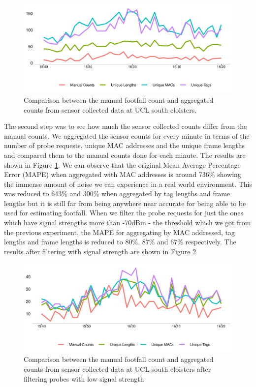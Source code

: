 \begin{figure}
  \includegraphics{images/ucl-comparison-before.png}
  \caption{Comparison between the manual footfall count and aggregated counts from sensor collected data at UCL south cloisters.}
  \label{figure:collection:ucl:before}
\end{figure}

The second step was to see how much the sensor collected counts differ from the manual counts.
We aggregated the sensor counts for every minute in terms of the number of probe requests, unique MAC addresses and the unique frame lengths and compared them to the manual counts done for each minute.
The results are shown in Figure \ref{figure:collection:ucl:before}.
We can observe that the original Mean Average Percentage Error (MAPE) when aggregated with MAC addresses is around 736\% showing the immense amount of noise we can experience in a real world environment.
This was reduced to 643\% and 300\% when aggregated by tag lengths and frame lengths but it is still far from being anywhere near accurate for being able to be used for estimating footfall.
When we filter the probe requests for just the ones which have signal strengths more than -70dBm - the threshold which we got from the previous experiment, the MAPE for aggregating by MAC addressed, tag lengths and frame lengths is reduced to 80\%, 87\% and 67\% respectively.
The results after filtering with signal strength are shown in Figure \ref{figure:collection:ucl:after}

\begin{figure}
  \includegraphics{images/ucl-comparison-after.png}
  \caption{Comparison between the manual footfall count and aggregated counts from sensor collected data at UCL south cloisters after filtering probes with low signal strength}
  \label{figure:collection:ucl:after}
\end{figure}

